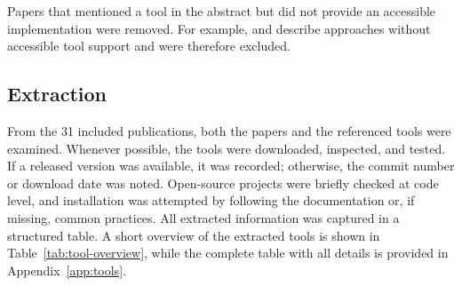 Papers that mentioned a tool in the abstract but did not provide an accessible implementation were removed. For example, \cite{casenotion} and \cite{ocprocesstrees} describe approaches without accessible tool support and were therefore excluded.

\subsection{Extraction}
From the 31 included publications, both the papers and the referenced tools were examined.
Whenever possible, the tools were downloaded, inspected, and tested.
If a released version was available, it was recorded; otherwise, the commit number or download date was noted.
Open-source projects were briefly checked at code level, and installation was attempted by following the documentation or, if missing, common practices.
All extracted information was captured in a structured table.
A short overview of the extracted tools is shown in Table~\ref{tab:tool-overview}, while the complete table with all details is provided in Appendix~\ref{app:tools}.

